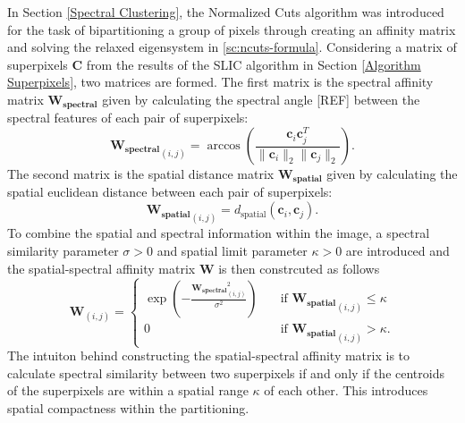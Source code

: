 In Section \ref{Spectral Clustering}, the Normalized Cuts algorithm was introduced for the task of bipartitioning a group of pixels through creating an affinity matrix and solving the relaxed eigensystem in \eqref{sc:ncuts-formula}. Considering a matrix of superpixels $\mathbf{C}$ from the results of the SLIC algorithm in Section \ref{Algorithm Superpixels}, two matrices are formed. The first matrix is the spectral affinity matrix $\mathbf{W_{\text{spectral}}}$ given by calculating the spectral angle [REF] between the spectral features of each pair of superpixels:
\begin{equation}
    \label{nc:spectral-mtx}
    \mathbf{W_{\text{spectral}}}_{(i,j)} = \arccos\left(\frac{\mathbf{c}_i \mathbf{c}_j^T}{\|\mathbf{c}_i\|_2\|\mathbf{c}_j\|_2}\right).
\end{equation}
The second matrix is the spatial distance matrix $\mathbf{W_{\text{spatial}}}$ given by calculating the spatial euclidean distance between each pair of superpixels:
\begin{equation}
    \label{nc:spatial-mtx}
    \mathbf{W_{\text{spatial}}}_{(i,j)} = d_{\text{spatial}}(\mathbf{c}_i, \mathbf{c}_j).
\end{equation}
To combine the spatial and spectral information within the image, a spectral similarity parameter $\sigma > 0$ and spatial limit parameter $\kappa > 0$ are introduced and the spatial-spectral affinity matrix $\mathbf{W}$ is then constrcuted as follows
\begin{equation}
    \label{nc:spatial-spectral-mtx}
    \mathbf{W}_{(i,j)} = \begin{cases}
        \exp\left(-\frac{\mathbf{W_{\text{spectral}}}_{(i,j)}^2}{\sigma^2}\right) &\quad \text{if } \mathbf{W_{\text{spatial}}}_{(i,j)} \leq \kappa\\
        0 &\quad \text{if } \mathbf{W_{\text{spatial}}}_{(i,j)} > \kappa.
    \end{cases}
\end{equation}
The intuiton behind constructing the spatial-spectral affinity matrix is to calculate spectral similarity between two superpixels if and only if the centroids of the superpixels are within a spatial range $\kappa$ of each other. This introduces spatial compactness within the partitioning.

